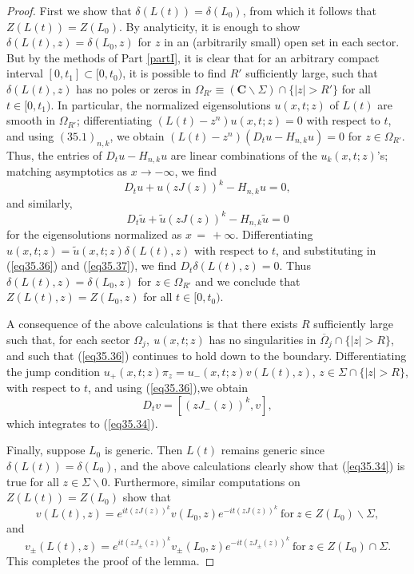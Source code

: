 \documentclass{surv-l}
\theoremstyle{plain}
\theoremstyle{definition}
\numberwithin{equation}{chapter}
\begin{document}
\begin{proof}
First we show that $\delta(L(t))=\delta(L_{0})$, from which it follows that $Z(L(t))=Z(L_{0})$. By analyticity, it is enough to show $\delta(L(t), z)=\delta(L_{0}, z)$ for $z$ in an (arbitrarily small) open set in each sector. But by the methods of Part \ref{partI}, it is clear that for an arbitrary compact interval $[0, t_{1}]\subset[0, t_{0})$, it is possible to find $R'$ sufficiently large, such that $\delta(L(t),z)$ has no poles or zeros in $\Omega_{R'}\equiv (\mathbf{C}\backslash \Sigma)\cap\{|z|>R'\}$ for all $t\in[0, t_{1})$. In particular, the normalized eigensolutions $u(x, t; z)$ of $L(t)$ are smooth in $\Omega_{R'}$; differentiating $(L(t)-z^{n})u(x, t;z)=0$ with respect to $t$, and using $(35.1)_{n,k}$, we obtain $(L(t)-z^{n})(D_{t}u-H_{n,k}u)=0$ for $z\in\Omega_{R'}$. Thus, the entries of $D_{t}u-H_{n,k}u$ are linear combinations of the $u_{k}(x,t; z)$'s; matching asymptotics as $ x\rightarrow-\infty$, we find
\begin{equation}\label{eq35.36}
D_{t}u+u(zJ(z))^{k}-H_{n,k}u=0,
\end{equation}
and similarly,
\begin{equation}\label{eq35.37}
D_{t}\tilde{u}+\tilde{u}(zJ(z))^{k}-H_{n,k}\tilde{u}=0
\end{equation}
for the eigensolutions normalized as $ x\,=\,+\infty$. Differentiating $u(x, t; z) =
\tilde{u}(x, t; z)\delta(L(t), z)$ with respect to $t$, and substituting in (\ref{eq35.36}) and (\ref{eq35.37}), we find $D_{t}\delta(L(t),z)=0$. Thus $\delta(L(t), z)=\delta(L_{0}, z)$ for $z\in\Omega_{R'}$ and we conclude that $Z(L(t), z)=Z(L_{0}, z)$ for all $t\in[0,t_{0})$.

A consequence of the above calculations is that there exists $R$ sufficiently large such that, for each sector $\Omega_{j},\ u(x, t;z)$ has no singularities in $\overline{\Omega}_{j}\cap\{|z|>R\}$, and such that (\ref{eq35.36}) continues to hold down to the boundary. Differentiating the jump condition $u_{+}(x, t;z)\pi_{z}=u_{-}(x, t; z)v(L(t), z)$, $z\in\Sigma\cap\{|z|>R\}$, with respect to $t$, and using (\ref{eq35.36}),we obtain
\begin{equation*}
D_{t}v=[(zJ_{-}(z))^{k}, v],
\end{equation*}
which integrates to (\ref{eq35.34}).

Finally, suppose $L_{0}$ is generic. Then $L(t)$ remains generic since $\delta(L(t))= \delta(L_{0})$, and the above calculations clearly show that (\ref{eq35.34}) is true for all $z\in\Sigma\backslash 0$. Furthermore, similar computations on $Z(L(t))=Z(L_{0})$ show that
\begin{equation*}
v(L(t),z)=e^{it(zJ(z))^{k}}v(L_{0}, z)e^{-it(zJ(z))^{k}}\ \mathrm{for}\ z\in Z(L_{0})\backslash \Sigma,
\end{equation*}
and
\begin{equation*}
v_{\pm}(L(t),z)=e^{it(zJ_{\pm}(z))^{k}}v_{\pm}(L_{0},z)e^{-it(zJ_{\pm}(z))^{k}}\ \mathrm{for}\  z\in Z(L_{0})\cap\Sigma.
\end{equation*}
This completes the proof of the lemma.\quad
\end{proof}
\end{document}
